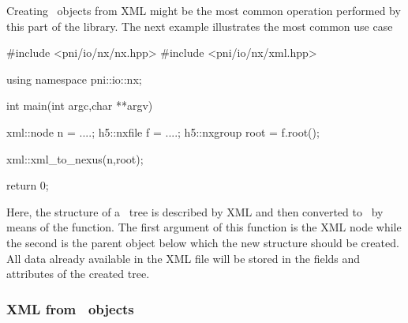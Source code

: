 Creating \nexus\ objects from XML might be the most common operation performed 
by this part of the library. The next example illustrates the most common 
use case 
\begin{cppcode}
#include <pni/io/nx/nx.hpp>
#include <pni/io/nx/xml.hpp>

using namespace pni::io::nx;

int main(int argc,char **argv)
{
    xml::node n = ....;
    h5::nxfile f = ....;
    h5::nxgroup root = f.root();
    
    xml::xml_to_nexus(n,root);

    return 0;
}
\end{cppcode}
Here, the structure of a \nexus\ tree is described by XML and then converted 
to \nexus\ by means of the  function. The first argument 
of this function is the XML node while the second is the parent object 
below which the new structure should be created. All data already available 
in the XML file will be stored in the fields and attributes of the created
\nexus\-tree. 


\subsubsection{XML from \nexus\ objects}\label{sec:xml:xmltonx}


